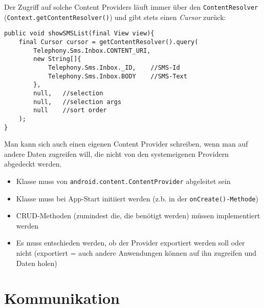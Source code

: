 \documentclass[a4paper, 11pt]{article}
\newcommand{\code}[1]{\texttt{#1}}
\begin{document}
Der Zugriff auf solche Content Providers läuft immer über den \code{ContentResolver} \\ (\code{Context.getContentResolver()}) und gibt stets einen \textit{Cursor} zurück:

\begin{lstlisting}[caption={Auslesen aller SMS mittels Content Provider}]
public void showSMSList(final View view){
	final Cursor cursor = getContentResolver().query(
		Telephony.Sms.Inbox.CONTENT_URI,
		new String[]{
			Telephony.Sms.Inbox._ID,	//SMS-Id
			Telephony.Sms.Inbox.BODY	//SMS-Text
		},
		null,	//selection
		null,	//selection args
		null	//sort order
	);
}
\end{lstlisting}
\vspace{10px}

\noindent Man kann sich auch einen eigenen Content Provider schreiben, wenn man auf andere Daten zugreifen will, die nicht von den systemeigenen Providern abgedeckt werden. 

\begin{itemize}
	\item Klasse muss von \code{android.content.ContentProvider} abgeleitet sein
	\item Klasse muss bei App-Start initiiert werden (z.b. in der \code{onCreate()-Methode})
	\item CRUD-Methoden (zumindest die, die benötigt werden) müssen implementiert werden
	\item Es muss entschieden werden, ob der Provider exportiert werden soll oder nicht (exportiert = auch andere Anwendungen können auf ihn zugreifen und Daten holen)
\end{itemize}


\section{Kommunikation}
\end{document}
